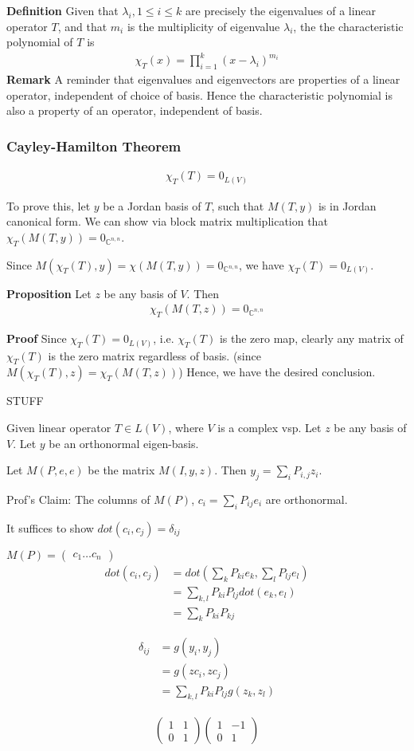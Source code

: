 \documentclass{article}
\begin{document}
\textbf{Definition} Given that $\lambda_i, 1\leq i\leq k$ are precisely the eigenvalues of a linear operator $T$, and that $m_i$ is the multiplicity of eigenvalue $\lambda_i$, the the characteristic polynomial of $T$ is 
\begin{align*}
	\chi_T(x)=\prod_{i=1}^k (x-\lambda_i)^{m_i}
\end{align*}
\textbf{Remark} A reminder that eigenvalues and eigenvectors are properties of a linear operator, independent of choice of basis. Hence the characteristic polynomial is also a property of an operator, independent of basis.


\subsubsection{Cayley-Hamilton Theorem}
\begin{align*}
	\chi_T(T)=0_{L(V)}
\end{align*}

To prove this, let $y$ be a Jordan basis of $T$, such that $M(T, y)$ is in Jordan canonical form. We can show via block matrix multiplication that $\chi_T(M(T,y))=0_{\mathbb{C}^{n,n}}$.

Since $M(\chi_T(T), y) = \chi(M(T, y)) = 0_{\mathbb{C}^{n,n}}$, we have $\chi_T(T)=0_{L(V)}$.

\textbf{Proposition} Let $z$ be any basis of $V$. Then 
\begin{align*}
	\chi_T(M(T,z))=0_{\mathbb{C}^{n,n}}
\end{align*}

\textbf{Proof} Since $\chi_T(T)=0_{L(V)}$, i.e. $\chi_T(T)$ is the zero map, clearly any matrix of $\chi_T(T)$ is the zero matrix regardless of basis. (since $M(\chi_T(T), z) = \chi_T(M(T, z))$) Hence, we have the desired conclusion.

STUFF

Given linear operator $T\in L(V)$, where $V$ is a complex vsp. Let $z$ be any basis of $V$. Let $y$ be an orthonormal eigen-basis.

Let $M(P, e, e)$ be the matrix $M(I, y, z)$.
Then $y_j = \sum_{i}P_{i,j}z_i$.

Prof's Claim: The columns of $M(P)$, $c_i=\sum_{i}P_{ij}e_i$ are orthonormal.

It suffices to show $dot(c_i, c_j)=\delta_{ij}$

$M(P)=\begin{pmatrix}
c_1 \dots c_n
\end{pmatrix}
$
\begin{align*}
dot(c_i, c_j) &= dot(\sum_kP_{ki}e_k,\sum_lP_{lj}e_l)\\
&=\sum_{k,l}P_{ki}P_{lj}dot(e_k,e_l)\\
&=
\sum_{k}P_{ki}P_{kj}
\end{align*}

\begin{align*}
\delta_{ij} &= g(y_i,y_j)\\&=g(zc_i, zc_j) \\&= \sum_{k,l}P_{ki}P_{lj}g(z_k,z_l)
\end{align*}

\begin{align*}
\begin{pmatrix}
1 & 1\\
0 & 1 
\end{pmatrix}
\begin{pmatrix}
1 & -1\\
0 & 1 
\end{pmatrix}
\end{align*}
\end{document}
